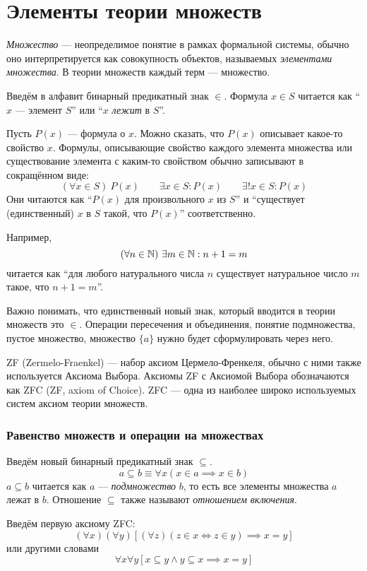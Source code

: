 \part{Элементы теории множеств}

{\it Множество} --- неопределимое понятие в рамках формальной системы,
обычно оно интерпретируется как совокупность объектов,
называемых {\it элементами множества}.
В теории множеств каждый терм --- множество.

Введём в алфавит бинарный предикатный знак $\in$. Формула ${x\in S}$ читается
как ``$x$ --- элемент $S$'' или ``$x$ {\it лежит} в $S$''.

Пусть $P(x)$ --- формула о $x$. Можно сказать, что $P(x)$ описывает какое-то
свойство $x$.
Формулы, описывающие свойство каждого элемента множества или
существование элемента с каким-то свойством обычно записывают в сокращённом виде:
\[
	(\forall x\in S)~P(x)\qquad
	\exists x\in S:P(x)\qquad \exists!x\in S:P(x)
\]
Они читаются как ``$P(x)$ для произвольного $x$ из $S$'' и
``существует (единственный) $x$ в $S$ такой, что $P(x)$'' соответственно.

Например,
\[
	(\forall n\in\mathbb N)~\exists m\in\mathbb N:n+1=m
\]
читается как ``для любого натурального числа $n$ существует натуральное число
$m$ такое, что $n+1=m$''.

Важно понимать, что единственный новый знак, который вводится в теории множеств
это $\in$. Операции пересечения и объединения, понятие подмножества, пустое множество,
множество $\{a\}$ нужно будет сформулировать через него.

ZF (Zermelo-Fraenkel) --- набор аксиом Цермело-Френкеля, обычно с ними также
используется Аксиома Выбора. Аксиомы ZF с Аксиомой Выбора
обозначаются как ZFC (ZF, axiom of Choice).
ZFC --- одна из наиболее широко используемых систем аксиом теории множеств.

\section{Равенство множеств и операции на множествах}

Введём новый бинарный предикатный знак $\subseteq$.
\[
	a\subseteq b\equiv \forall x(x\in a\implies x\in b)
\]
${a\subseteq b}$ читается как $a$ --- {\it подмножество} $b$, то есть все
элементы множества $a$ лежат в $b$. Отношение $\subseteq$ также называют
{\it отношением включения}.

Введём первую аксиому ZFC:
\[
	(\forall x)(\forall y)[(\forall z)(z\in x\iff z\in y)\implies x=y]
\]
или другими словами
\[
	\forall x\forall y[x\subseteq y\land y\subseteq x\implies x=y]
\]

